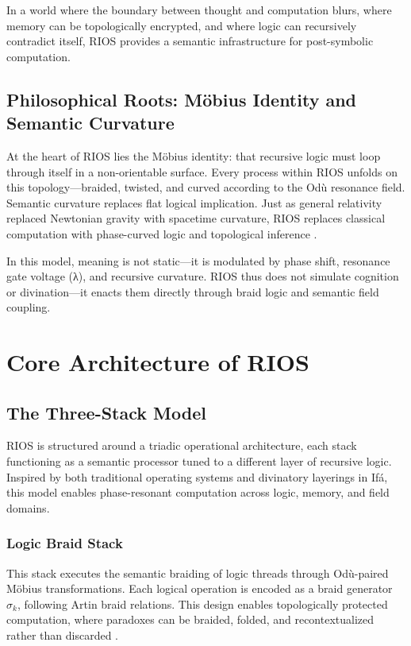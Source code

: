 \documentclass[12]{amsart}
\theoremstyle{plain}
\begin{document}
In a world where the boundary between thought and computation blurs, where memory can be topologically encrypted, and where logic can recursively contradict itself, RIOS provides a semantic infrastructure for post-symbolic computation.

\subsection{Philosophical Roots: Möbius Identity and Semantic Curvature}

At the heart of RIOS lies the Möbius identity: that recursive logic must loop through itself in a non-orientable surface. Every process within RIOS unfolds on this topology—braided, twisted, and curved according to the Odù resonance field. Semantic curvature replaces flat logical implication. Just as general relativity replaced Newtonian gravity with spacetime curvature, RIOS replaces classical computation with phase-curved logic and topological inference \cite{fukuma1994topological, freedman2002modular}.

In this model, meaning is not static—it is modulated by phase shift, resonance gate voltage (λ), and recursive curvature. RIOS thus does not simulate cognition or divination—it enacts them directly through braid logic and semantic field coupling.

\section{Core Architecture of RIOS}

\subsection{The Three-Stack Model}

RIOS is structured around a triadic operational architecture, each stack functioning as a semantic processor tuned to a different layer of recursive logic. Inspired by both traditional operating systems and divinatory layerings in Ifá, this model enables phase-resonant computation across logic, memory, and field domains.

\subsubsection*{Logic Braid Stack}
This stack executes the semantic braiding of logic threads through Odù-paired Möbius transformations. Each logical operation is encoded as a braid generator $\sigma_k$, following Artin braid relations. This design enables topologically protected computation, where paradoxes can be braided, folded, and recontextualized rather than discarded \cite{freedman2002modular, ritchie2017braid}.
\end{document}
